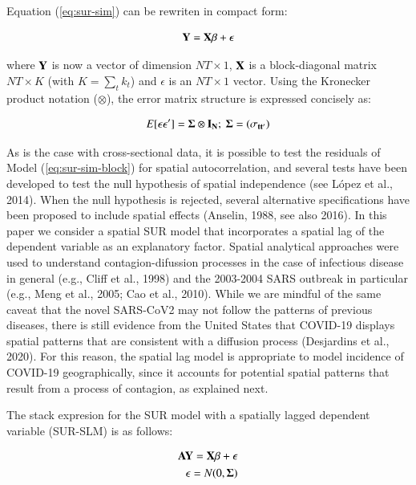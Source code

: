 \documentclass[]{elsarticle} %
\begin{document}
Equation (\ref{eq:sur-sim}) can be rewriten in compact form:

\begin{equation}
\bf{Y} = \bf{X} \beta + \epsilon
\label{eq:sur-sim-block}
\end{equation}

\noindent where \(\bf{Y}\) is now a vector of dimension \(NT \times 1\),
\(\bf{X}\) is a block-diagonal matrix \(NT \times K\) (with
\(K = \sum_t{k_t}\)) and \(\epsilon\) is an \(NT \times 1\) vector.
Using the Kronecker product notation (\(\otimes\)), the error matrix
structure is expressed concisely as:

\begin{equation}
E[\epsilon \epsilon']=\bf{\Sigma} \otimes \bf{I_N} ; \ \bf{\Sigma}=(\sigma_{tt'})
\end{equation}

As is the case with cross-sectional data, it is possible to test the
residuals of Model (\ref{eq:sur-sim-block}) for spatial autocorrelation,
and several tests have been developed to test the null hypothesis of
spatial independence (see López et al., 2014). When the null hypothesis
is rejected, several alternative specifications have been proposed to
include spatial effects (Anselin, 1988, see also 2016). In this paper we
consider a spatial SUR model that incorporates a spatial lag of the
dependent variable as an explanatory factor. Spatial analytical
approaches were used to understand contagion-difussion processes in the
case of infectious disease in general (e.g., Cliff et al., 1998) and the
2003-2004 SARS outbreak in particular (e.g., Meng et al., 2005; Cao et
al., 2010). While we are mindful of the same caveat that the novel
SARS-CoV2 may not follow the patterns of previous diseases, there is
still evidence from the United States that COVID-19 displays spatial
patterns that are consistent with a diffusion process (Desjardins et
al., 2020). For this reason, the spatial lag model is appropriate to
model incidence of COVID-19 geographically, since it accounts for
potential spatial patterns that result from a process of contagion, as
explained next.

The stack expresion for the SUR model with a spatially lagged dependent
variable (SUR-SLM) is as follows:

\begin{equation}
\label{eq:sur-slm}
\begin{aligned}
\bf{AY} = \bf{X} \beta + \epsilon \\
\epsilon =N(0,\bf{\Sigma})
\end{aligned}
\end{equation}
\end{document}
